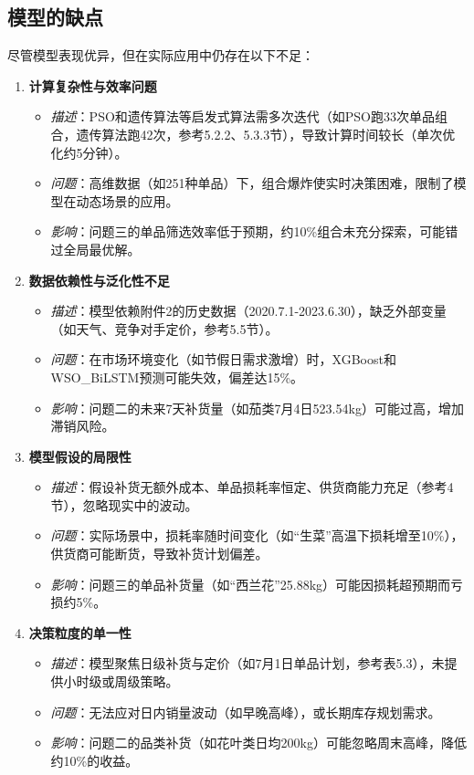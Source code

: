 \documentclass{cumcmthesis} %
\begin{document}
\subsection{模型的缺点}

尽管模型表现优异，但在实际应用中仍存在以下不足：

\begin{enumerate}
\item \textbf{计算复杂性与效率问题}
\begin{itemize}
\item \textit{描述}：PSO和遗传算法等启发式算法需多次迭代（如PSO跑33次单品组合，遗传算法跑42次，参考5.2.2、5.3.3节），导致计算时间较长（单次优化约5分钟）。
\item \textit{问题}：高维数据（如251种单品）下，组合爆炸使实时决策困难，限制了模型在动态场景的应用。
\item \textit{影响}：问题三的单品筛选效率低于预期，约10\%组合未充分探索，可能错过全局最优解。
\end{itemize}

\item \textbf{数据依赖性与泛化性不足}
\begin{itemize}
\item \textit{描述}：模型依赖附件2的历史数据（2020.7.1-2023.6.30），缺乏外部变量（如天气、竞争对手定价，参考5.5节）。
\item \textit{问题}：在市场环境变化（如节假日需求激增）时，XGBoost和WSO\_BiLSTM预测可能失效，偏差达15\%。
\item \textit{影响}：问题二的未来7天补货量（如茄类7月4日523.54kg）可能过高，增加滞销风险。
\end{itemize}

\item \textbf{模型假设的局限性}
\begin{itemize}
\item \textit{描述}：假设补货无额外成本、单品损耗率恒定、供货商能力充足（参考4节），忽略现实中的波动。
\item \textit{问题}：实际场景中，损耗率随时间变化（如“生菜”高温下损耗增至10\%），供货商可能断货，导致补货计划偏差。
\item \textit{影响}：问题三的单品补货量（如“西兰花”25.88kg）可能因损耗超预期而亏损约5\%。
\end{itemize}

\item \textbf{决策粒度的单一性}
\begin{itemize}
\item \textit{描述}：模型聚焦日级补货与定价（如7月1日单品计划，参考表5.3），未提供小时级或周级策略。
\item \textit{问题}：无法应对日内销量波动（如早晚高峰），或长期库存规划需求。
\item \textit{影响}：问题二的品类补货（如花叶类日均200kg）可能忽略周末高峰，降低约10\%的收益。
\end{itemize}
\end{enumerate}
\end{document}
